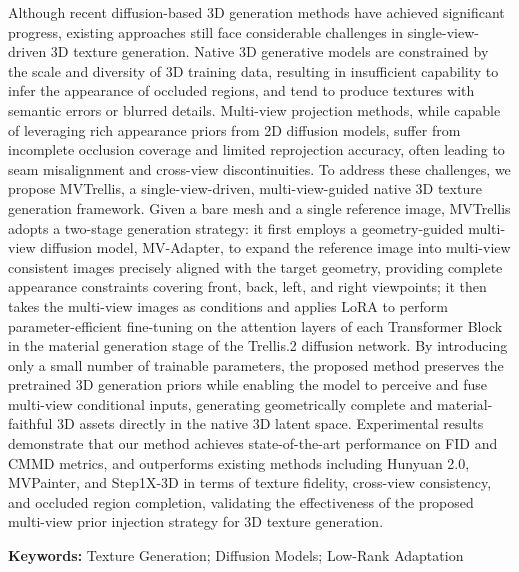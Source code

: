 Although recent diffusion-based 3D generation methods have achieved significant progress,
existing approaches still face considerable challenges in single-view-driven 3D texture generation.
Native 3D generative models are constrained by the scale and diversity of 3D training data,
resulting in insufficient capability to infer the appearance of occluded regions,
and tend to produce textures with semantic errors or blurred details.
Multi-view projection methods, while capable of leveraging rich appearance priors
from 2D diffusion models, suffer from incomplete occlusion coverage and limited
reprojection accuracy, often leading to seam misalignment and cross-view discontinuities.
To address these challenges, we propose MVTrellis, a single-view-driven,
multi-view-guided native 3D texture generation framework.
Given a bare mesh and a single reference image, MVTrellis adopts a two-stage generation strategy:
it first employs a geometry-guided multi-view diffusion model, MV-Adapter,
to expand the reference image into multi-view consistent images
precisely aligned with the target geometry,
providing complete appearance constraints covering front, back, left, and right viewpoints;
it then takes the multi-view images as conditions and applies LoRA to perform
parameter-efficient fine-tuning on the attention layers of each Transformer Block
in the material generation stage of the Trellis.2 diffusion network.
By introducing only a small number of trainable parameters,
the proposed method preserves the pretrained 3D generation priors
while enabling the model to perceive and fuse multi-view conditional inputs,
generating geometrically complete and material-faithful 3D assets
directly in the native 3D latent space.
Experimental results demonstrate that our method achieves state-of-the-art performance
on FID and CMMD metrics, and outperforms existing methods including
Hunyuan 2.0, MVPainter, and Step1X-3D in terms of texture fidelity,
cross-view consistency, and occluded region completion,
validating the effectiveness of the proposed multi-view prior injection strategy
for 3D texture generation.

\vspace{0.7em}

\noindent\textbf{Keywords: }Texture Generation; Diffusion Models; Low-Rank Adaptation
